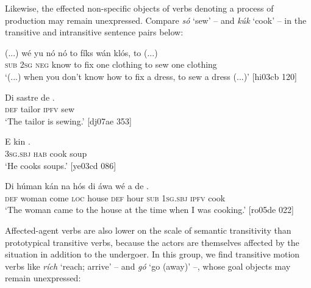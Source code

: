 Likewise, the effected non-specific objects of verbs denoting a process of production may remain unexpressed. Compare \textit{só} ‘sew’ – and \textit{kúk} ‘cook’ – in the transitive and intransitive sentence pairs below: 


\ea%
    \label{ex:key:1280}
    \gll (...)  wé  yu  nó  nó    to  fíks  wán  klós,  to            (...)\\
  {} \textsc{sub}  \textsc{2sg}  \textsc{neg}  know  to  fix  one  clothing  to  sew  one    clothing\\

\glt ‘(...) when you don’t know how to fix a dress, to sew a dress (...)’ [hi03cb 120]
\z


\ea%
    \label{ex:key:1281}
    \gll Di  sastre  de    .\\
\textsc{def}  tailor  \textsc{ipfv}    sew\\

\glt ‘The tailor is sewing.’ [dj07ae 353]
\z


\ea%
    \label{ex:key:1282}
    \gll E    kin      .\\
\textsc{3sg.sbj}  \textsc{hab}  cook  soup\\

\glt ‘He cooks soups.’ [ye03cd 086]
\z


\ea%
    \label{ex:key:1283}
    \gll Di  húman  kán    na  hós    di  áwa    wé  a    de  .\\
\textsc{def}  woman  come  \textsc{loc}  house  \textsc{def}  hour  \textsc{sub}  \textsc{1sg.sbj}  \textsc{ipfv}  cook\\

\glt ‘The woman came to the house at the time when I was cooking.’ [ro05de 022]
\z

Affected-agent verbs are also lower on the scale of semantic transitivity than prototypical transitive verbs, because the actors are themselves affected by the situation in addition to the undergoer. In this group, we find transitive motion verbs like \textit{rích} ‘reach; arrive’ – and \textit{gó} ‘go (away)’ –, whose goal objects may remain unexpressed: 



